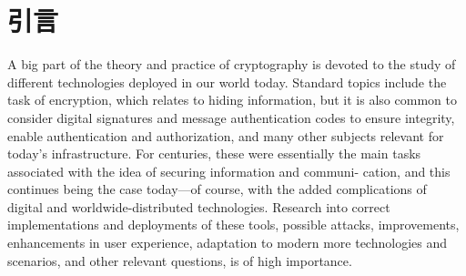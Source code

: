 \chapter*{引言}\label{chp:00intro}


A big part of the theory and practice of cryptography is devoted to the study of different technologies deployed in our world today. Standard topics include the task of encryption, which relates to hiding information, but it is also common to consider digital signatures and message authentication codes to ensure integrity, enable authentication and authorization, and many other subjects relevant for today’s infrastructure. For centuries, these were essentially the main tasks associated with the idea of securing information and communi- cation, and this continues being the case today—of course, with the added complications of digital and worldwide-distributed technologies. Research into correct implementations and deployments of these tools, possible attacks, improvements, enhancements in user experience, adaptation to modern more technologies and scenarios, and other relevant questions, is of high importance.
